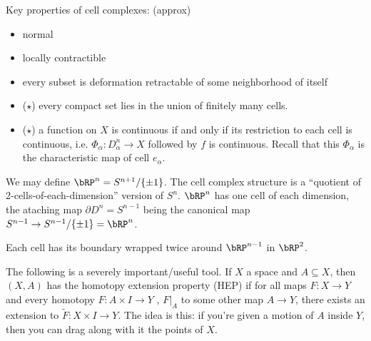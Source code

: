 Key properties of cell complexes: (approx)
\begin{itemize}
  \item normal
  \item locally contractible
  \item every subset is deformation retractable of some neighborhood of itself
  \item ($\star$) every compact set lies in the union of finitely many cells.
  \item ($\star$) a function on $X$ is continuous if and only if its restriction to each cell is continuous, i.e. $\Phi_\alpha : D_\alpha^n \to X$ followed by $f$ is continuous. Recall that this $\Phi_\alpha$ is the characteristic map of cell $e_\alpha$.
\end{itemize}

\begin{example}\label{example:real-projective-space}
  We may define $\bRP^n = S^{n+1}/\{\pm 1\}$. The cell complex structure is a ``quotient of 2-cells-of-each-dimension'' version of $S^n$. $\bRP^n$ has one cell of each dimension, the ataching map $\partial D^n = S^{n-1}$ being the canonical map $S^{n-1} \to S^{n-1}/\{\pm 1\} = \bRP^n$.

  Each cell has its boundary wrapped twice around $\bRP^{n-1}$ in $\bRP^2$.
\end{example}

The following is a severely important/useful tool. If $X$ a space and $A \subseteq X$, then $(X,A)$ has the homotopy extension property (HEP) if for all maps $F:X\to Y$ and every homotopy $F:A\times I \to Y$ , $F|_A$ to some other map $A \to Y$, there exists an extension to $\tilde{F}:X\times I \to Y$. The idea is this: if you're given a motion of $A$ inside $Y$, then you can drag along with it the points of $X$.

